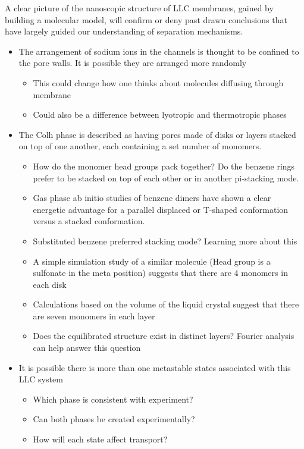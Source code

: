 \documentclass{article}
\begin{document}
	A clear picture of the nanoscopic structure of LLC membranes, gained by building a molecular model, 
will confirm or deny past drawn conclusions that have largely guided our understanding of separation mechanisms. 
	\begin{itemize}
		\item The arrangement of sodium ions in the channels is thought to be confined to the pore walls. It is possible they are arranged more randomly
		\begin{itemize}
			\item This could change how one thinks about molecules diffusing through membrane
			\item Could also be a difference between lyotropic and thermotropic phases
		\end{itemize}
		\item The Colh phase is described as having pores made of disks or layers stacked on top of one another, each containing a set number of monomers. 
		\begin{itemize}
			\item How do the monomer head groups pack together? Do the benzene rings prefer to be stacked on top of each other or in another pi-stacking mode.
			\item Gas phase ab initio studies of benzene dimers have shown a clear energetic advantage for a parallel displaced or T-shaped conformation versus a stacked conformation. 
			\item Substituted benzene preferred stacking mode? Learning more about this   	
			\item A simple simulation study of a similar molecule (Head group is a sulfonate in the meta position) suggests that there are 4 monomers in each disk
			\item Calculations based on the volume of the liquid crystal suggest that there are seven monomers in each layer 
			\item Does the equilibrated structure exist in distinct layers? Fourier analysis can help answer this question
		\end{itemize}
		\item It is possible there is more than one metastable states associated with this LLC system
		\begin{itemize}
			\item Which phase is consistent with experiment?
			\item Can both phases be created experimentally?
			\item How will each state affect transport?
		\end{itemize}
	\end{itemize}
	
\end{document}

